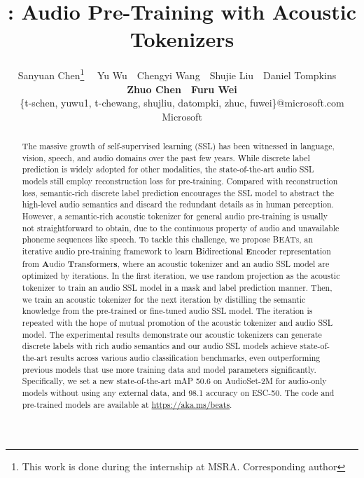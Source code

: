 \documentclass{article}
\title{\our{}\img{icon.png}: Audio Pre-Training with Acoustic Tokenizers}
\author{Sanyuan Chen\thanks{This work is done during the internship at MSRA.  Corresponding author } ~\
  Yu Wu~\
  Chengyi Wang~\
  Shujie Liu~\
  Daniel Tompkins~\ \\
  \textbf{Zhuo Chen}~\
  \textbf{Furu Wei} \\
  \{t-schen, yuwu1, t-chewang, shujliu, datompki, zhuc, fuwei\}@microsoft.com  \\
    Microsoft  \\
}
\theoremstyle{plain}
\theoremstyle{definition}
\theoremstyle{remark}
\newcommand\our{\textsc{BEATs}}
\begin{document}
\maketitle

\begin{abstract}
 The massive growth of self-supervised learning (SSL) has been witnessed in language, vision, speech, and audio domains over the past few years. While discrete label prediction is widely adopted for other modalities, the state-of-the-art audio SSL models still employ reconstruction loss for pre-training.  Compared with reconstruction loss, semantic-rich discrete label prediction encourages the SSL model to abstract the high-level audio semantics and discard the redundant details as in human perception. However, a semantic-rich acoustic tokenizer for general audio pre-training is usually not straightforward to obtain, due to the continuous property of audio and unavailable phoneme sequences like speech. To tackle this challenge, we propose \our{}, an iterative audio pre-training framework to learn \textbf{B}idirectional \textbf{E}ncoder representation from \textbf{A}udio \textbf{T}ransformer\textbf{s}, where an acoustic tokenizer and an audio SSL model are optimized by iterations. In the first iteration, we use random projection as the acoustic tokenizer to train an audio SSL model in a mask and label prediction manner. Then, we train an acoustic tokenizer for the next iteration by distilling the semantic knowledge from the pre-trained or fine-tuned audio SSL model. The iteration is repeated with the hope of mutual promotion of the acoustic tokenizer and audio SSL model. The experimental results demonstrate our acoustic tokenizers can generate discrete labels with rich audio semantics and our audio SSL models achieve state-of-the-art results across various audio classification benchmarks, even outperforming previous models that use more training data and model parameters significantly. Specifically, we set a new state-of-the-art mAP 50.6 on AudioSet-2M  for audio-only models without using any external data, and 98.1 accuracy on ESC-50. The code and pre-trained models are available at \url{https://aka.ms/beats}.
\end{abstract}
\end{document}
